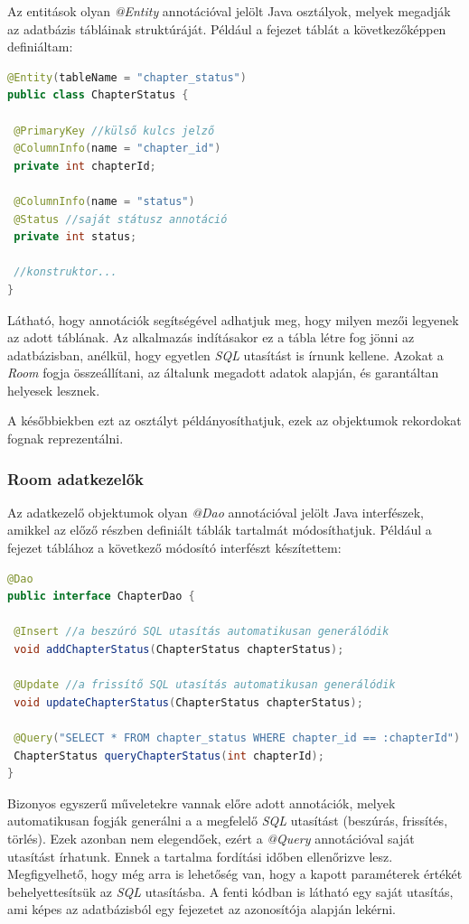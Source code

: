 \documentclass[12pt,a4paper]{article}
\begin{document}
	Az entitások olyan \textit{@Entity} annotációval jelölt Java osztályok, melyek megadják az adatbázis tábláinak struktúráját. Például a fejezet táblát a következőképpen definiáltam:
	
	\begin{lstlisting}[language=Java]
@Entity(tableName = "chapter_status")
public class ChapterStatus {
	
 @PrimaryKey //külső kulcs jelző
 @ColumnInfo(name = "chapter_id")
 private int chapterId;
	
 @ColumnInfo(name = "status")
 @Status //saját státusz annotáció
 private int status;
 
 //konstruktor...
}
	\end{lstlisting}  
	
	Látható, hogy annotációk segítségével adhatjuk meg, hogy milyen mezői legyenek az adott táblának. Az alkalmazás indításakor ez a tábla létre fog jönni az adatbázisban, anélkül, hogy egyetlen \textit{SQL} utasítást is írnunk kellene. Azokat a \textit{Room} fogja összeállítani, az általunk megadott adatok alapján, és garantáltan helyesek lesznek.
	
	A későbbiekben ezt az osztályt példányosíthatjuk, ezek az objektumok rekordokat fognak reprezentálni.

	\subsubsection{Room adatkezelők}
	
	Az adatkezelő objektumok olyan \textit{@Dao} annotációval jelölt Java interfészek, amikkel az előző részben definiált táblák tartalmát módosíthatjuk. Például a fejezet táblához a következő módosító interfészt készítettem:
	
	\begin{lstlisting}[language=Java]
@Dao
public interface ChapterDao {
	
 @Insert //a beszúró SQL utasítás automatikusan generálódik
 void addChapterStatus(ChapterStatus chapterStatus);
	
 @Update //a frissítő SQL utasítás automatikusan generálódik
 void updateChapterStatus(ChapterStatus chapterStatus);
	
 @Query("SELECT * FROM chapter_status WHERE chapter_id == :chapterId")
 ChapterStatus queryChapterStatus(int chapterId);
}
	\end{lstlisting}

	Bizonyos egyszerű műveletekre vannak előre adott annotációk, melyek automatikusan fogják generálni a a megfelelő \textit{SQL} utasítást (beszúrás, frissítés, törlés). Ezek azonban nem elegendőek, ezért a \textit{@Query} annotációval saját utasítást írhatunk. Ennek a tartalma fordítási időben ellenőrizve lesz. Megfigyelhető, hogy még arra is lehetőség van, hogy a kapott paraméterek értékét behelyettesítsük az \textit{SQL} utasításba. A fenti kódban is látható egy saját utasítás, ami képes az adatbázisból egy fejezetet az azonosítója alapján lekérni.
\end{document}

